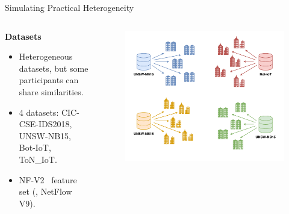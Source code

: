\begin{frame}{Simulating Practical Heterogeneity}
  \begin{columns}
    \begin{column}{.5\textwidth}
      \textbf{Datasets}
      \begin{itemize}
        \item Heterogeneous datasets, but some participants can share similarities.
        \item 4 datasets: CIC-CSE-IDS2018, UNSW-NB15, Bot-IoT, ToN\_IoT.
        \item NF-V2~\autocite{sarhan_StandardFeatureSet_2021} feature set (\ie, NetFlow V9).
      \end{itemize}
    \end{column}
    \begin{column}{.5\textwidth}
      \begin{figure}
        \includegraphics[width=\linewidth]{figures/eval/setup/partition.pdf}%
      \end{figure}
    \end{column}
  \end{columns}
\end{frame}

